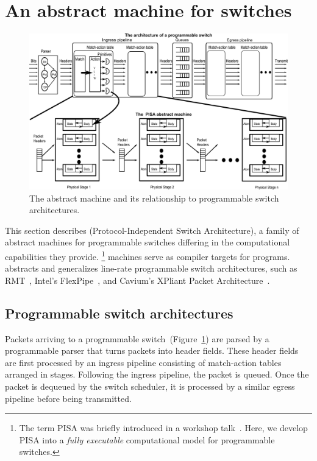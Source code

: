 \section{An abstract machine for switches}
\label{s:absmachine}

\begin{figure}[!t]
  \includegraphics[width=\textwidth]{pisa.pdf}
  \caption{The \absmachine abstract machine and its relationship to
  programmable switch architectures.}
  \label{fig:switch}
\end{figure}

This section describes \absmachine (Protocol-Independent Switch Architecture),
a family of abstract machines for programmable switches differing in the
computational capabilities they provide.  \footnote{The term PISA was briefly
  introduced in a workshop talk~\cite{nick_p4}.  Here, we develop PISA into a
\textit{fully executable} computational model for programmable switches.}
\absmachine machines serve as compiler targets for \pktlanguage programs.
\absmachine abstracts and generalizes line-rate programmable switch
architectures, such as RMT~\cite{rmt}, Intel's FlexPipe~\cite{flexpipe}, and
Cavium's XPliant Packet Architecture~\cite{xpliant}.

\subsection{Programmable switch architectures}
Packets arriving to a programmable switch~(Figure~\ref{fig:switch}) are parsed
by a programmable parser that turns packets into header fields. These header
fields are first processed by an ingress pipeline consisting of match-action
tables arranged in stages.  Following the ingress pipeline, the packet is
queued. Once the packet is dequeued by the switch scheduler, it is processed by
a similar egress pipeline before being transmitted.

